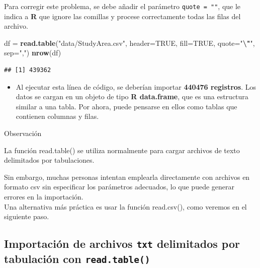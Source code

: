 \documentclass[
]{book}
\newenvironment{Shaded}{\begin{snugshade}}{\end{snugshade}}
\newcommand{\AttributeTok}[1]{\textcolor[rgb]{0.13,0.29,0.53}{#1}}
\newcommand{\ConstantTok}[1]{\textcolor[rgb]{0.56,0.35,0.01}{#1}}
\newcommand{\FunctionTok}[1]{\textcolor[rgb]{0.13,0.29,0.53}{\textbf{#1}}}
\newcommand{\NormalTok}[1]{#1}
\newcommand{\OtherTok}[1]{\textcolor[rgb]{0.56,0.35,0.01}{#1}}
\newcommand{\SpecialCharTok}[1]{\textcolor[rgb]{0.81,0.36,0.00}{\textbf{#1}}}
\newcommand{\StringTok}[1]{\textcolor[rgb]{0.31,0.60,0.02}{#1}}
\providecommand{\tightlist}{%
  \setlength{\itemsep}{0pt}\setlength{\parskip}{0pt}}
\begin{document}
Para corregir este problema, se debe añadir el parámetro \texttt{quote\ =\ ""}, que le indica a \textbf{R} que ignore las comillas y procese correctamente todas las filas del archivo.

\begin{Shaded}
\begin{Highlighting}[]
\NormalTok{df }\OtherTok{=} \FunctionTok{read.table}\NormalTok{(}\StringTok{"data/StudyArea.csv"}\NormalTok{, }
                \AttributeTok{header=}\ConstantTok{TRUE}\NormalTok{, }
                \AttributeTok{fill=}\ConstantTok{TRUE}\NormalTok{, }
                \AttributeTok{quote=}\StringTok{"}\SpecialCharTok{\textbackslash{}"}\StringTok{"}\NormalTok{, }
                \AttributeTok{sep=}\StringTok{","}\NormalTok{)}
\FunctionTok{nrow}\NormalTok{(df)}
\end{Highlighting}
\end{Shaded}

\begin{verbatim}
## [1] 439362
\end{verbatim}

\begin{itemize}
\tightlist
\item
  Al ejecutar esta línea de código, se deberían importar \textbf{440476 registros}. Los datos se cargan en un objeto de tipo \textbf{R data.frame}, que es una estructura similar a una tabla. Por ahora, puede pensarse en ellos como tablas que contienen columnas y filas.
\end{itemize}

{} Observación

La función read.table() se utiliza normalmente para cargar archivos de texto delimitados por tabulaciones.

Sin embargo, muchas personas intentan emplearla directamente con archivos en formato csv sin especificar los parámetros adecuados, lo que puede generar errores en la importación.\\
Una alternativa más práctica es usar la función read.csv(), como veremos en el siguiente paso.

\subsection{\texorpdfstring{Importación de archivos \texttt{txt} delimitados por tabulación con \texttt{read.table()}}{Importación de archivos txt delimitados por tabulación con read.table()}}\label{importaciuxf3n-de-archivos-txt-delimitados-por-tabulaciuxf3n-con-read.table}
\end{document}
